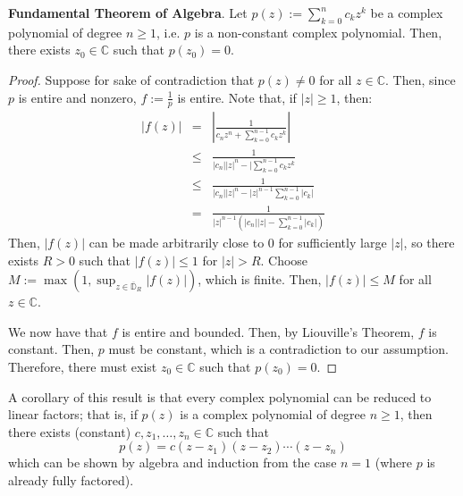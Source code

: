 \begin{shaded}
    \textbf{Fundamental Theorem of Algebra}. Let $p(z) := \sum_{k=0}^n c_k z^k$ be a complex polynomial of degree $n\geq 1$, i.e. $p$ is a non-constant complex polynomial. Then, there exists $z_0\in\mathbb{C}$ such that $p(z_0) = 0$.

    \begin{proof}
        Suppose for sake of contradiction that $p(z)\neq 0$ for all $z\in\mathbb{C}$. Then, since $p$ is entire and nonzero, $f:=\frac{1}{p}$ is entire. Note that, if $|z|\geq 1$, then: \begin{eqnarray*}
            |f(z)| &=& \left|\frac{1}{c_nz^n + \sum_{k=0}^{n-1} c_k z^k}\right|\\
            &\leq& \frac{1}{|c_n||z|^n - |\sum_{k=0}^{n-1} c_k z^k}\\
            &\leq& \frac{1}{|c_n||z|^n - |z|^{n-1}\sum_{k=0}^{n-1}|c_k|}\\
            &=& \frac{1}{|z|^{n-1} \left(|c_n||z| - \sum_{k=0}^{n-1} |c_k|\right)}
        \end{eqnarray*} Then, $|f(z)|$ can be made arbitrarily close to $0$ for sufficiently large $|z|$, so there exists $R>0$ such that $|f(z)|\leq 1$ for $|z|> R$. Choose $M:=\max\left(1,\displaystyle\sup_{z\in\overline{\mathbb{D}}_R} |f(z)|\right)$, which is finite. Then, $|f(z)|\leq M$ for all $z\in\mathbb{C}$.

        We now have that $f$ is entire and bounded. Then, by Liouville's Theorem, $f$ is constant. Then, $p$ must be constant, which is a contradiction to our assumption. Therefore, there must exist $z_0\in\mathbb{C}$ such that $p(z_0)=0$.
    \end{proof}

    A corollary of this result is that every complex polynomial can be reduced to linear factors; that is, if $p(z)$ is a complex polynomial of degree $n\geq 1$, then there exists (constant) $c,z_1,\dots,z_n\in\mathbb{C}$ such that \[p(z) = c(z-z_1)(z-z_2)\cdots(z-z_n)\] which can be shown by algebra and induction from the case $n=1$ (where $p$ is already fully factored).
\end{shaded}

